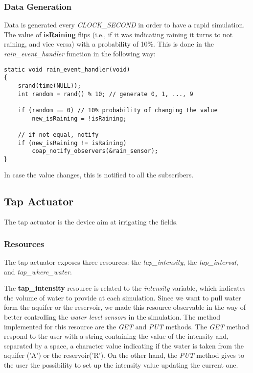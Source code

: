 \subsubsection{Data Generation}
Data is generated every \textit{CLOCK\_SECOND} in order to have a rapid simulation. The value of \textbf{isRaining} flips (i.e., if it was indicating raining it turns to not raining, and vice versa) with a probability of 10\%. This is done in the \textit{rain\_event\_handler} function in the following way:

\begin{lstlisting}
static void rain_event_handler(void)
{
    srand(time(NULL));
    int random = rand() % 10; // generate 0, 1, ..., 9
    
    if (random == 0) // 10% probability of changing the value
        new_isRaining = !isRaining;

    // if not equal, notify
    if (new_isRaining != isRaining)
        coap_notify_observers(&rain_sensor);
}
\end{lstlisting}

In case the value changes, this is notified to all the subscribers.




\subsection{Tap Actuator}
The tap actuator is the device aim at irrigating the fields.

\subsubsection{Resources}
The tap actuator exposes three resources: the \textit{tap\_intensity}, the \textit{tap\_interval}, and \textit{tap\_where\_water}.

The \textbf{tap\_intensity} resource is related to the \textit{intensity} variable, which indicates the volume of water to provide at each simulation. Since we want to pull water form the aquifer or the reservoir, we made this resource observable in the way of better controlling the \textit{water level sensors} in the simulation. The method implemented for this resource are the \textit{GET} and \textit{PUT} methods. The \textit{GET} method respond to the user with a string containing the value of the intensity and, separated by a space, a character value indicating if the water is taken from the aquifer ('A') or the reservoir('R'). On the other hand, the \textit{PUT} method gives to the user the possibility to set up the intensity value updating the current one.

